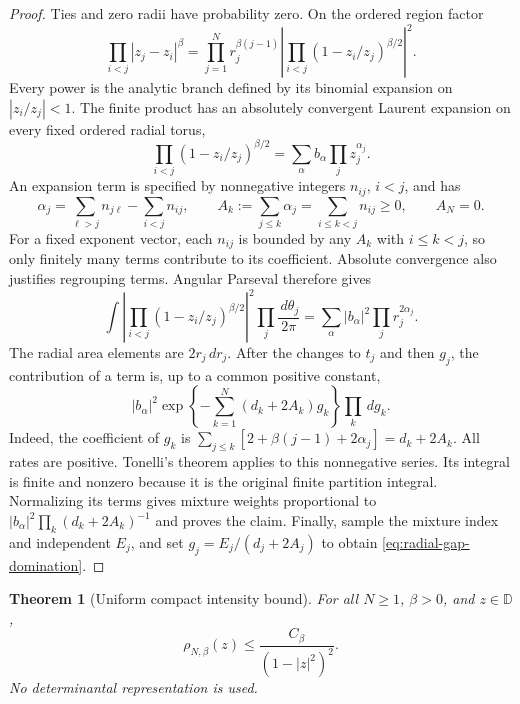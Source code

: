\documentclass[11pt]{article}
\newcommand{\D}{\mathbb D}
\newcommand{\dd}{\,d}
\newtheorem{theorem}{Theorem}[section]
\theoremstyle{remark}\newtheorem{remark}[theorem]{Remark}
\begin{document}
\begin{proof}
Ties and zero radii have probability zero. On the ordered region factor
\[
 \prod_{i<j}|z_j-z_i|^\beta
 =\prod_{j=1}^N r_j^{\beta(j-1)}
   \left|\prod_{i<j}(1-z_i/z_j)^{\beta/2}\right|^2.
\]
Every power is the analytic branch defined by its binomial expansion
on $|z_i/z_j|<1$. The finite product has an absolutely convergent
Laurent expansion on every fixed ordered radial torus,
\[
 \prod_{i<j}(1-z_i/z_j)^{\beta/2}
   =\sum_\alpha b_\alpha\prod_j z_j^{\alpha_j}.
\]
An expansion term is specified by nonnegative integers $n_{ij}$,
$i<j$, and has
\[
 \alpha_j=\sum_{\ell>j}n_{j\ell}-\sum_{i<j}n_{ij},
 \qquad
 A_k:=\sum_{j\le k}\alpha_j
       =\sum_{i\le k<j}n_{ij}\ge0,
 \qquad A_N=0.
\]
For a fixed exponent vector, each $n_{ij}$ is bounded by any $A_k$
with $i\le k<j$, so only finitely many terms contribute to its
coefficient. Absolute convergence also justifies regrouping terms.
Angular Parseval therefore gives
\[
 \int\left|\prod_{i<j}(1-z_i/z_j)^{\beta/2}\right|^2
       \prod_j\frac{\dd\theta_j}{2\pi}
 =\sum_\alpha |b_\alpha|^2\prod_j r_j^{2\alpha_j}.
\]
The radial area elements are $2r_j\dd r_j$. After the changes to
$t_j$ and then $g_j$, the contribution of a term is, up to a common
positive constant,
\[
 |b_\alpha|^2
 \exp\left\{-\sum_{k=1}^N(d_k+2A_k)g_k\right\}
 \prod_k\dd g_k.
\]
Indeed, the coefficient of $g_k$ is
$\sum_{j\le k}[2+\beta(j-1)+2\alpha_j]=d_k+2A_k$.
All rates are positive. Tonelli's theorem applies to this nonnegative
series. Its integral is finite and nonzero because it is the original
finite partition integral. Normalizing its terms gives mixture weights
proportional to
$|b_\alpha|^2\prod_k(d_k+2A_k)^{-1}$ and proves the claim.
Finally, sample the mixture index and independent $E_j$, and set
$g_j=E_j/(d_j+2A_j)$ to obtain \eqref{eq:radial-gap-domination}.
\end{proof}

\begin{theorem}[Uniform compact intensity bound]
\label{thm:uniform-actual-intensity}
For all $N\ge1$, $\beta>0$, and $z\in\D$,
\begin{equation}\label{eq:actual-uniform-bergman-upper}
 \rho_{N,\beta}(z)\le\frac{C_\beta}{(1-|z|^2)^2}.
\end{equation}
No determinantal representation is used.
\end{theorem}
\end{document}
